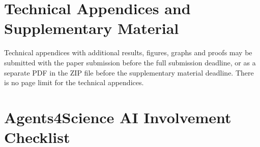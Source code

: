 \documentclass{article}
\begin{document}



\appendix
\section{Technical Appendices and Supplementary Material}
Technical appendices with additional results, figures, graphs and proofs may be submitted with the paper submission before the full submission deadline, or as a separate PDF in the ZIP file before the supplementary material deadline. There is no page limit for the technical appendices.

\newpage

\section*{Agents4Science AI Involvement Checklist}
\end{document}
